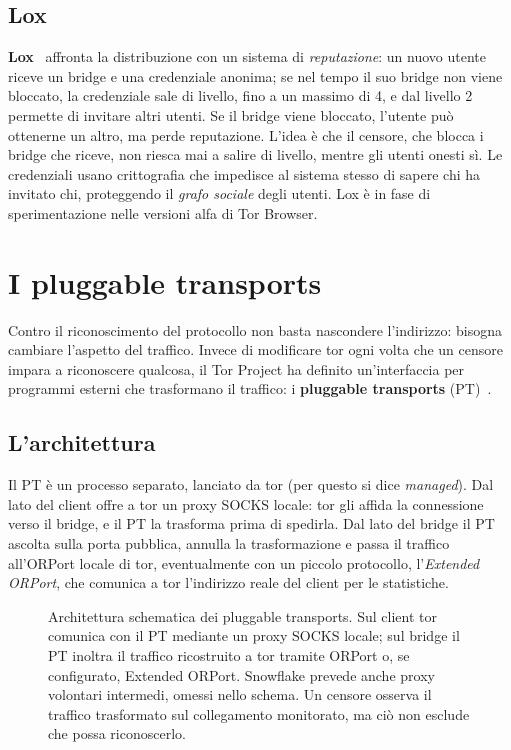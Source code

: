\subsection{Lox}

\textbf{Lox}~\cite{tulloch2023lox} affronta la distribuzione con un sistema di \emph{reputazione}: un nuovo utente riceve un bridge e una credenziale anonima; se nel tempo il suo bridge non viene bloccato, la credenziale sale di livello, fino a un massimo di 4, e dal livello 2 permette di invitare altri utenti. Se il bridge viene bloccato, l'utente può ottenerne un altro, ma perde reputazione. L'idea è che il censore, che blocca i bridge che riceve, non riesca mai a salire di livello, mentre gli utenti onesti sì. Le credenziali usano crittografia che impedisce al sistema stesso di sapere chi ha invitato chi, proteggendo il \emph{grafo sociale} degli utenti. Lox è in fase di sperimentazione nelle versioni alfa di Tor Browser.

\section{I pluggable transports}\label{sec:cens-pt}

Contro il riconoscimento del protocollo non basta nascondere l'indirizzo: bisogna cambiare l'aspetto del traffico. Invece di modificare tor ogni volta che un censore impara a riconoscere qualcosa, il Tor Project ha definito un'interfaccia per programmi esterni che trasformano il traffico: i \textbf{pluggable transports} (PT)~.

\subsection{L'architettura}

Il PT è un processo separato, lanciato da tor (per questo si dice \emph{managed}). Dal lato del client offre a tor un proxy SOCKS locale: tor gli affida la connessione verso il bridge, e il PT la trasforma prima di spedirla. Dal lato del bridge il PT ascolta sulla porta pubblica, annulla la trasformazione e passa il traffico all'ORPort locale di tor, eventualmente con un piccolo protocollo, l'\emph{Extended ORPort}, che comunica a tor l'indirizzo reale del client per le statistiche.

\begin{figure}[htbp]
\centering

\caption{Architettura schematica dei pluggable transports. Sul client tor comunica con il PT mediante un proxy SOCKS locale; sul bridge il PT inoltra il traffico ricostruito a tor tramite ORPort o, se configurato, Extended ORPort. Snowflake prevede anche proxy volontari intermedi, omessi nello schema. Un censore osserva il traffico trasformato sul collegamento monitorato, ma ciò non esclude che possa riconoscerlo.}
\label{fig:pt}
\end{figure}

